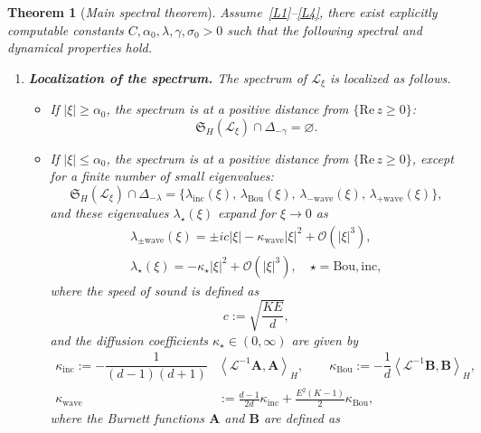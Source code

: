 \documentclass[10pt]{amsart}
\newtheorem{theo}{Theorem}[section]
\theoremstyle{definition}\newtheorem{defi}[theo]{Definition}\newtheorem{rema}[theo]{Remark}\newtheorem{exam}[theo]{Example}\newtheorem{exem}[theo]{Example}\newtheorem{nota}[theo]{Notation}
\newcommand{\Wave}{\mathrm{wave}}
\newcommand{\Inc}{\mathrm{inc}}
\newcommand{\Bou}{\mathrm{Bou}}
\newcommand{\re}{\mathrm{Re}\,}
\newcommand{\BurA}{{\mathbf{A}}}
\newcommand{\BurB}{{\mathbf{B}}}
\newcommand{\fkS}{\mathfrak{S}}
\newcommand{\OO}{\mathcal{O}}
\newcommand{\LL}{\mathcal{L}}
\newcommand{\Ss}{H}
\renewcommand*\le{\leqslant}
\renewcommand*\ge{\geqslant}
\newcommand*{\relabel}{\renewcommand{\labelenumi}{(\theenumi)}}
\newcommand*{\bfenumi}{\renewcommand*{\theenumi}{\textit{\textbf{\arabic{enumi}}}}\relabel}
\begin{document}
\begin{theo}[\emph{Main spectral theorem}]\label{thm:spectral_study}
Assume~\eqref{L1}--\eqref{L4}, there exist {explicitly computable constants} $C, \alpha_{0}, \lambda, \gamma, \sigma_0 > 0$ such that the following spectral and dynamical properties hold.
\begin{enumerate}\bfenumi
\item\label{theo1.8.1}\textit{\textbf{Localization of the spectrum.}} The spectrum of $\LL_\xi$ is localized as follows.
\begin{itemize}
\item If $|\xi| \ge \alpha_{0}$, the spectrum is at a positive distance from $\{ \re z \ge 0 \}$:
\[
\fkS_{\Ss}\left(\LL_{\xi}\right) \cap \Delta_{-\gamma} = \varnothing.
\]
\item If $|\xi| \le \alpha_{0}$, the spectrum is at a positive distance from $\{ \re z \ge 0 \}$, except for a finite number of small eigenvalues:
\[
\fkS_{\Ss}(\LL_{\xi}) \cap \Delta_{-\lambda} = \big\{ \lambda_\Inc(\xi), \, \lambda_\Bou(\xi), \, \lambda_{- \Wave}(\xi), \,\lambda_{+\Wave}(\xi) \big\},
\]
and these eigenvalues $\lambda_\star(\xi)$ expand for $\xi \to 0$ as
\begin{subequations}\label{eq:lambda_star}
\begin{gather}
\lambda_{\pm \Wave}(\xi) = \pm i c | \xi | - \kappa_\Wave | \xi |^2 + \OO\left(| \xi |^3 \right),\\
\lambda_{\star}(\xi) = - \kappa_\star | \xi |^2 + \OO\left(| \xi |^3 \right), \quad \star = \Bou, \Inc,
\end{gather}
\end{subequations}
where the speed of sound is defined as
\begin{equation}\label{eq:speed_sound}
c:=\sqrt{\frac{KE}{d}},
\end{equation}
and the diffusion coefficients $\kappa_\star \in (0, \infty)$ are given by
\begin{equation}\label{eq:kappa}
\begin{split}
\kappa_\Inc := - \dfrac{1}{(d-1)(d+1) } &\left \langle \LL^{-1} \BurA,\BurA \right \rangle_{\Ss},
\qquad \kappa_\Bou := - \dfrac{1}{d} \left \langle \LL^{-1} \BurB, \BurB \right \rangle_{\Ss},\\
\kappa_\Wave &:= \frac{d-1}{2 d} \kappa_\Inc + \frac{E^2(K-1)}{2} \kappa_\Bou,
\end{split}
\end{equation}
where the Burnett functions $\BurA $ and $\BurB $ are defined as

\end{itemize}
\end{enumerate}
\end{theo}
\end{document}
